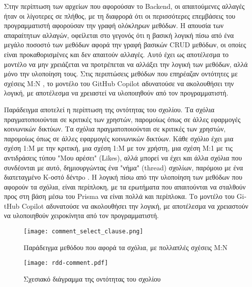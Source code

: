 Στην περίπτωση των αρχείων που αφορούσαν το \textlatin{Backend}, οι
απαιτούμενες αλλαγές ήταν οι λίγοτερες σε πλήθος, με τη διαφρορά ότι οι
περισσότερες επεμβάσεις του προγραμματιστή αφορούσαν την γραφή ολόκληρων
μεθόδων. Η απουσία των απαραίτητων αλλαγών, οφείλεται στο γεγονός ότι η
βασική λογική πίσω από ένα μεγάλο ποσοστό των μεθόδων αφορά την γραφή
βασικών \textlatin{CRUD} μεθόδων, οι οποίες είναι προκαθορισμένες και
δεν απαιτούν αλλαγές. Αυτό έχει ως αποτέλεσμα το μοντέλο να μην
χρειάζεται να προτρέπεται να αλλάξει την λογική των μεθόδων, αλλά μόνο
την υλοποίηση τους. Στις περιπτώσεις μεθόδων που επηρέαζαν οντότητες με
σχέσεις Μ:Ν \cite{prisma2022manytomany}, το μοντέλο του
\textlatin{GitHub Copilot} αδυνατούσε να ακολουθήσει την λογική, με
αποτέλεσμα να χρειαστεί να υλοποιηθούν από τον προγραμματιστή.

Παράδειγμα αποτελεί η περίπτωση της οντότητας του σχολίου. Τα σχόλια
πραγματοποιούνται σε κριτικές των χρηστών, παρομοίως όπως σε άλλες
εφαρμογές κοινωνικών δικτύων. Τα σχόλια πραγματοποιούνται σε κριτικές
των χρηστών, παρομοίως όπως σε άλλες εφαρμογές κοινωνικών δικτύων. Κάθε
σχόλιο έχει μια σχέση 1:Μ με την κριτική, μια σχέση 1:Μ με τον χρήστη,
μια σχέση Μ:1 με τις αντιδράσεις τύπου "Μου αρέσει" \textlatin{(Likes)},
αλλά μπορεί να έχει και άλλα σχόλια που συνδέονται με αυτό,
δημιουργώντας ένα "νήμα" \textlatin{(thread)} σχολίων, παρόμοιο
με ένα διατεταγμένο Κ-οστό δέντρo \cite{gabillon2002access}. Η λογική
πίσω από την υλοποίηση των μεθόδων που αφορούν τα σχόλια, είναι
περίπλοκη, με τα ερωτήματα που απαιτούνται να σταλθούν προς στη βάση
μέσω του \textlatin{Prisma} να είναι πολλά και περίπλοκα. Το μοντέλο του
\textlatin{GitHub Copilot} αδυνατούσε να ακολουθήσει την λογική, με
αποτέλεσμα να χρειαστούν να υλοποιηθούν χειροκίνητα από τον προγραμματιστή.

\begin{figure}[H]
  \centering
  \texttt{[image: comment\_select\_clause.png]}
  \caption{Παράδειγμα μεθόδου που αφορά τα σχόλια, με πολλαπλές
  σχέσεις Μ:Ν}
  \label{fig:commentSelectClause}
\end{figure}

\begin{figure}[H]
  \begin{center}
    \texttt{[image: rdd-comment.pdf]}
    \caption{Σχεσιακό διάγραμμα της οντότητας του σχολίου}
  \end{center}
  \label{fig:commentRdd}
\end{figure}

